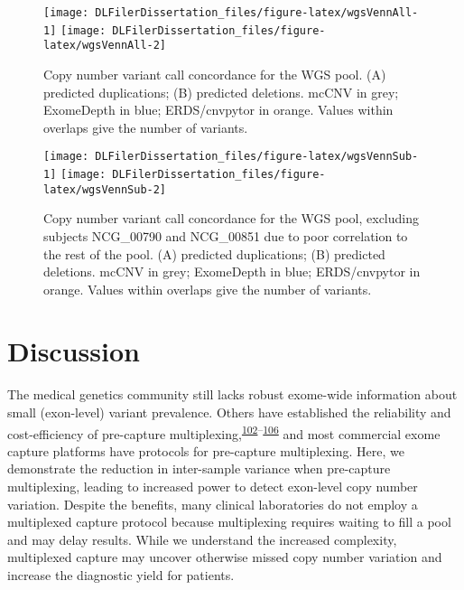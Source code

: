 \documentclass[11pt,letterpaper]{book}
\begin{document}
\begin{figure}

{\centering \texttt{[image: DLFilerDissertation\_files/figure-latex/wgsVennAll-1]} \texttt{[image: DLFilerDissertation\_files/figure-latex/wgsVennAll-2]} 

}

\caption[Copy number variant call concordance for the WGS pool.]{Copy number variant call concordance for the WGS pool. (A) predicted duplications; (B) predicted deletions. mcCNV in grey; ExomeDepth in blue; ERDS/cnvpytor in orange. Values within overlaps give the number of variants.}\label{fig:wgsVennAll}
\end{figure}



\begin{figure}

{\centering \texttt{[image: DLFilerDissertation\_files/figure-latex/wgsVennSub-1]} \texttt{[image: DLFilerDissertation\_files/figure-latex/wgsVennSub-2]} 

}

\caption[Copy number variant call concordance for the WGS pool, excluding subjects NCG\_00790 and NCG\_00851 due to poor correlation to the rest of the pool.]{Copy number variant call concordance for the WGS pool, excluding subjects NCG\_00790 and NCG\_00851 due to poor correlation to the rest of the pool. (A) predicted duplications; (B) predicted deletions. mcCNV in grey; ExomeDepth in blue; ERDS/cnvpytor in orange. Values within overlaps give the number of variants.}\label{fig:wgsVennSub}
\end{figure}

\hypertarget{discussion}{%
\section{Discussion}\label{discussion}}

The medical genetics community still lacks robust exome-wide information about small (exon-level) variant prevalence.
Others have established the reliability and cost-efficiency of pre-capture multiplexing,\textsuperscript{\protect\hyperlink{ref-neiman:2012aa}{102}--\protect\hyperlink{ref-shearer:2012aa}{106}} and most commercial exome capture platforms have protocols for pre-capture multiplexing.
Here, we demonstrate the reduction in inter-sample variance when pre-capture multiplexing, leading to increased power to detect exon-level copy number variation.
Despite the benefits, many clinical laboratories do not employ a multiplexed capture protocol because multiplexing requires waiting to fill a pool and may delay results.
While we understand the increased complexity, multiplexed capture may uncover otherwise missed copy number variation and increase the diagnostic yield for patients.
\end{document}
